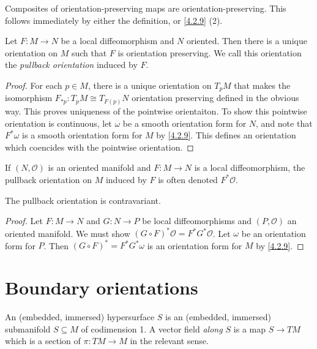 \begin{remark}\label{4.2.10}
	Composites of orientation-preserving maps are orientation-preserving. This follows immediately by either the definition, or \cref{4.2.9} (2).
\end{remark}

\begin{proposition}\label{4.2.11}
	Let $F : M \to N$ be a local diffeomorphism and $N$ oriented. Then there is a unique orientation on $M$ such that $F$ is orientation preserving. We call this orientation the \emph{pullback orientation} induced by $F$.
\end{proposition}
\begin{proof}
	For each $p\in M$, there is a unique orientation on $T_pM$ that makes the isomorphism $F_{*p} : T_pM \cong T_{F(p)} N$ orientation preserving defined in the obvious way. This proves uniqueness of the pointwise orientaiton. To show this pointwise orientation is continuous, let $\omega $ be a smooth orientation form for $N$, and note that $F^*\omega $ is a smooth orientation form for $M$ by \cref{4.2.9}. This defines an orientation which coencides with the pointwise orientation.
\end{proof}

\begin{notation}\label{4.2.12}
	If $(N,\mathcal{O} )$ is an oriented manifold and $F : M \to N$ is a local diffeomorphism, the pullback orientation on $M$ induced by $F$ is often denoted $F^*\mathcal{O} $.
\end{notation}

\begin{proposition}\label{4.2.13}
	The pullback orientation is contravariant.
\end{proposition}
\begin{proof}
	Let $F : M \to N$ and $G : N \to P$ be local diffeomorphisms and $(P,\mathcal{O} )$ an oriented manifold. We must show $(G\circ F)^*\mathcal{O} =F^*G^*\mathcal{O} $. Let $\omega $ be an orientation form for $P$. Then $(G\circ F)^*=F^*G^*\omega $ is an orientation form for $M$ by \cref{4.2.9}.
\end{proof}

\section{Boundary orientations}

An (embedded, immersed) hypersurface $S$ is an (embedded, immersed) submanifold $S\subseteq M$ of codimension 1. A vector field \emph{along $S$} is a map $S\to TM$ which is a section of $\pi : TM \to M$ in the relevant sense.

